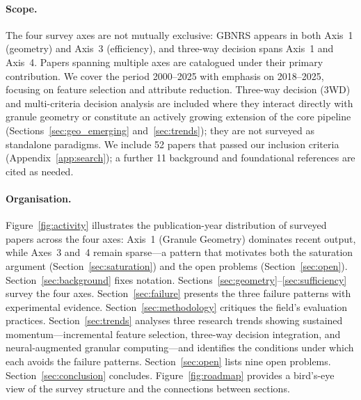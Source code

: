 \paragraph{Scope.}
The four survey axes are not mutually exclusive: GBNRS appears in both
Axis~1 (geometry) and Axis~3 (efficiency), and three-way decision spans
Axis~1 and Axis~4.  Papers spanning multiple axes are catalogued under
their primary contribution.
We cover the period 2000--2025 with emphasis on 2018--2025, focusing on
feature selection and attribute reduction.  Three-way decision (3WD) and
multi-criteria decision analysis are included where they interact directly
with granule geometry or constitute an actively growing extension of the
core pipeline (Sections~\ref{sec:geo_emerging} and~\ref{sec:trends});
they are not surveyed as standalone paradigms.  We include 52 papers that
passed our inclusion criteria (Appendix~\ref{app:search}); a further 11
background and foundational references are cited as needed.

\paragraph{Organisation.}
Figure~\ref{fig:activity} illustrates the publication-year distribution of
surveyed papers across the four axes: Axis~1 (Granule Geometry) dominates
recent output, while Axes~3 and~4 remain sparse---a pattern that motivates
both the saturation argument (Section~\ref{sec:saturation}) and the open
problems (Section~\ref{sec:open}).
Section~\ref{sec:background} fixes notation.
Sections~\ref{sec:geometry}--\ref{sec:sufficiency} survey the four axes.
Section~\ref{sec:failure} presents the three failure patterns with
experimental evidence.  Section~\ref{sec:methodology} critiques the
field's evaluation practices.  Section~\ref{sec:trends} analyses three
research trends showing sustained momentum---incremental feature selection,
three-way decision integration, and neural-augmented granular
computing---and identifies the conditions under which each avoids the
failure patterns.  Section~\ref{sec:open} lists nine open problems.
Section~\ref{sec:conclusion} concludes.
Figure~\ref{fig:roadmap} provides a bird's-eye view of the survey
structure and the connections between sections.

